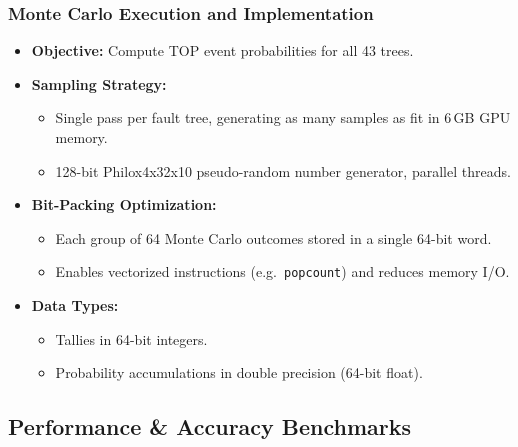 \begin{frame}[t]
\frametitle{Monte Carlo Execution and Implementation}
\begin{itemize}
  \item \textbf{Objective:} Compute TOP event probabilities for all 43 trees.
  \item \textbf{Sampling Strategy:}
    \begin{itemize}
      \item Single pass per fault tree, generating as many samples as fit in 6\,GB GPU memory.  
      \item 128-bit Philox4x32x10 pseudo-random number generator, parallel threads.
    \end{itemize}
  \item \textbf{Bit-Packing Optimization:}
    \begin{itemize}
      \item Each group of 64 Monte Carlo outcomes stored in a single 64-bit word.  
      \item Enables vectorized instructions (e.g.\ \texttt{popcount}) and reduces memory I/O.
    \end{itemize}
  \item \textbf{Data Types:}
    \begin{itemize}
      \item Tallies in 64-bit integers.  
      \item Probability accumulations in double precision (64-bit float).  
    \end{itemize}
\end{itemize}
\end{frame}

\subsection{Performance \& Accuracy Benchmarks}
